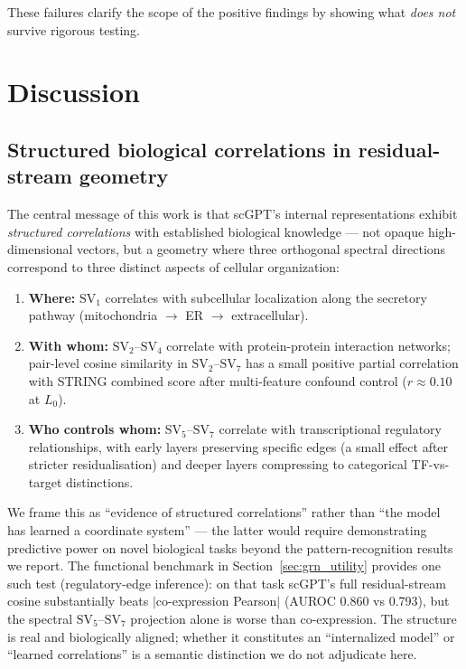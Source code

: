 \documentclass[12pt]{article}
\newcommand{\SV}[1]{\mathrm{SV}_{#1}}
\begin{document}
These failures clarify the scope of the positive findings by showing what \emph{does not} survive rigorous testing.

\section{Discussion}

\subsection{Structured biological correlations in residual-stream geometry}

The central message of this work is that scGPT's internal representations exhibit \emph{structured correlations} with established biological knowledge --- not opaque high-dimensional vectors, but a geometry where three orthogonal spectral directions correspond to three distinct aspects of cellular organization:

\begin{enumerate}
  \item \textbf{Where:} $\SV{1}$ correlates with subcellular localization along the secretory pathway (mitochondria $\to$ ER $\to$ extracellular).
  \item \textbf{With whom:} $\SV{2}$--$\SV{4}$ correlate with protein-protein interaction networks; pair-level cosine similarity in $\SV{2}$--$\SV{7}$ has a small positive partial correlation with STRING combined score after multi-feature confound control ($r \approx 0.10$ at $L_0$).
  \item \textbf{Who controls whom:} $\SV{5}$--$\SV{7}$ correlate with transcriptional regulatory relationships, with early layers preserving specific edges (a small effect after stricter residualisation) and deeper layers compressing to categorical TF-vs-target distinctions.
\end{enumerate}

We frame this as ``evidence of structured correlations'' rather than ``the model has learned a coordinate system'' --- the latter would require demonstrating predictive power on novel biological tasks beyond the pattern-recognition results we report.
The functional benchmark in Section~\ref{sec:grn_utility} provides one such test (regulatory-edge inference): on that task scGPT's full residual-stream cosine substantially beats $|$co-expression Pearson$|$ (AUROC 0.860 vs 0.793), but the spectral $\SV{5}$--$\SV{7}$ projection alone is worse than co-expression.
The structure is real and biologically aligned; whether it constitutes an ``internalized model'' or ``learned correlations'' is a semantic distinction we do not adjudicate here.
\end{document}
